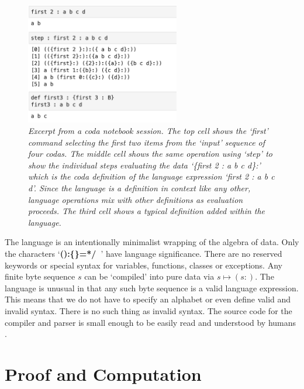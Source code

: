 \documentclass[11pt]{article}
\begin{document}
\begin{figure}[h]
\centering
\includegraphics[width=0.6\textwidth]{fig1.png}
\caption{{\it Excerpt from a coda notebook session.  The top cell shows the `first' command selecting the first two items from the `input'
sequence of four codas.  The middle cell shows the same operation using `step' to  show the individual steps evaluating the
data `\{first 2 : a b c d\}:' which is the coda definition of the language expression `first 2 : a b c d'.  Since the language is a definition
in context like any other, language operations mix with other definitions as evaluation proceeds.  The third cell shows a typical definition added within the language.}}
\end{figure}

     The language is an intentionally minimalist wrapping of the algebra of data.
Only the characters `{\bf():\{\}=*/\ }' have language significance.  There are no reserved keywords or
special syntax for variables, functions, classes or exceptions.  Any finite byte sequence $s$ can be `compiled' into pure data via $s\mapsto (s:)$.  
The language is unusual in that any such byte sequence is a valid language expression.
This means that we do not have to specify an alphabet or even define valid and invalid syntax.  There is no such thing
as invalid syntax.  The source code for the compiler and parser is small enough to be easily read and understood by
humans \cite{github}.

\section{Proof and Computation}
\end{document}
